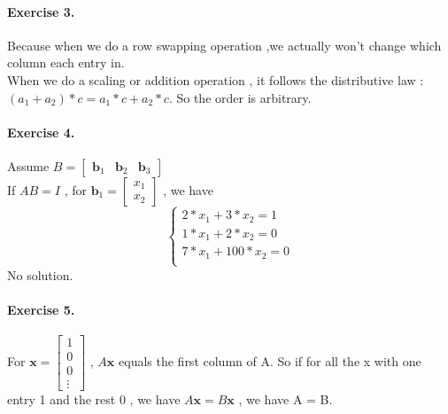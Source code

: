 \documentclass{article}
\begin{document}
\paragraph{Exercise 3.}
    Because when we do a row swapping operation ,we actually won't change which column each entry in.\\
    When we do a  scaling or addition operation , it follows the distributive law : $ (a_1 + a_2) * c = a_1 * c + a_2 * c $. So the order is arbitrary.\\

\paragraph{Exercise 4.}
        Assume $ B = \begin{bmatrix} \mathbf{b}_1 & \mathbf{b}_2 &  \mathbf{b}_3 \end{bmatrix} $\\
        If $ AB=I$ , for $ \mathbf{b}_1= \begin{bmatrix}
            x_1\\x_2
        \end{bmatrix}$ , we have
        \[
        \left\{
             \begin{array}
                {rcl}
                2*x_1+3*x_2=1\\
                1*x_1+2*x_2=0\\
                7*x_1+100*x_2=0\\
            \end{array}
        \right.
        \]
        No solution.
\paragraph{Exercise 5.}
    For $ \mathbf{x}= \begin{bmatrix}
        1 \\ 0 \\ 0 \\\vdots
    \end{bmatrix}$ , $ A\mathbf{x} $ equals the first column of A. So if for all the x with one entry 1 and the rest 0 , we have $ A\mathbf{x} = B\mathbf{x}$ , we have A = B.
\end{document}
